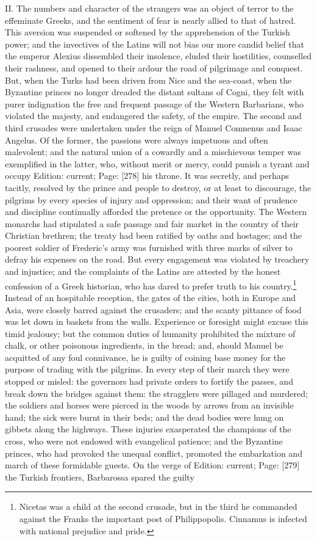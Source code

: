 II. The numbers and character of the strangers was an object of terror to the effeminate Greeks, and the sentiment of fear is nearly allied to that of hatred. This aversion was suspended or softened by the apprehension of the Turkish power; and the invectives of the Latins will not bias our more candid belief that the emperor Alexius dissembled their insolence, eluded their hostilities, counselled their rashness, and opened to their ardour the road of pilgrimage and conquest. But, when the Turks had been driven from Nice and the sea-coast, when the Byzantine princes no longer dreaded the distant sultans of Cogni, they felt with purer indignation the free and frequent passage of the Western Barbarians, who violated the majesty, and endangered the safety, of the empire. The second and third crusades were undertaken under the reign of Manuel Comnenus and Isaac Angelus. Of the former, the passions were always impetuous and often malevolent; and the natural union of a cowardly and a mischievous temper was exemplified in the latter, who, without merit or mercy, could punish a tyrant and occupy Edition: current; Page: [278] his throne. It was secretly, and perhaps tacitly, resolved by the prince and people to destroy, or at least to discourage, the pilgrims by every species of injury and oppression; and their want of prudence and discipline continually afforded the pretence or the opportunity. The Western monarchs had stipulated a safe passage and fair market in the country of their Christian brethren; the treaty had been ratified by oaths and hostages; and the poorest soldier of Frederic\texthebrew{}’s army was furnished with three marks of silver to defray his expenses on the road. But every engagement was violated by treachery and injustice; and the complaints of the Latins are attested by the honest confession of a Greek historian, who has dared to prefer truth to his country.\footnote{Nicetas was a child at the second crusade, but in the third he commanded against the Franks the important post of Philippopolis. Cinnamus is infected with national prejudice and pride.} Instead of an hospitable reception, the gates of the cities, both in Europe and Asia, were closely barred against the crusaders; and the scanty pittance of food was let down in baskets from the walls. Experience or foresight might excuse this timid jealousy; but the common duties of humanity prohibited the mixture of chalk, or other poisonous ingredients, in the bread; and, should Manuel be acquitted of any foul connivance, he is guilty of coining base money for the purpose of trading with the pilgrims. In every step of their march they were stopped or misled: the governors had private orders to fortify the passes, and break down the bridges against them: the stragglers were pillaged and murdered; the soldiers and horses were pierced in the woods by arrows from an invisible hand; the sick were burnt in their beds; and the dead bodies were hung on gibbets along the highways. These injuries exasperated the champions of the cross, who were not endowed with evangelical patience; and the Byzantine princes, who had provoked the unequal conflict, promoted the embarkation and march of these formidable guests. On the verge of Edition: current; Page: [279] the Turkish frontiers, Barbarossa spared the guilty 